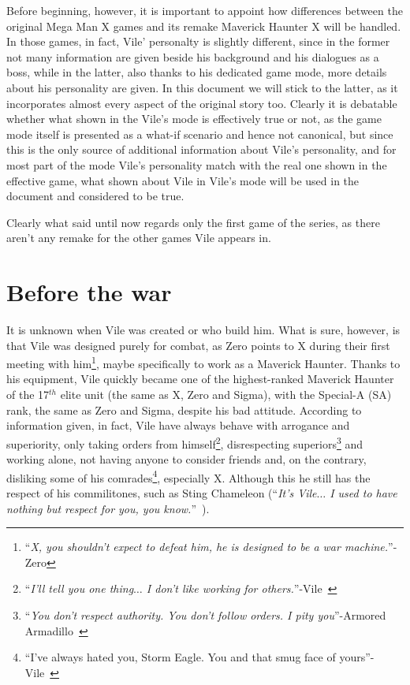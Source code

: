 Before beginning, however, it is important to appoint how differences between the original Mega Man X games and its remake Maverick Haunter X will be handled. In those games, in fact, Vile' personalty is slightly different, since in the former not many information are given beside his background and his dialogues as a boss, while in the latter, also thanks to his dedicated game mode, more details about his personality are given. In this document we will stick to the latter, as it incorporates almost every aspect of the original story too. Clearly it is debatable whether what shown in the Vile's mode is effectively true or not, as the game mode itself is presented as a what-if scenario and hence not canonical, but since this is the only source of additional information about Vile's personality, and for most part of the mode Vile's personality match with the real one shown in the effective game, what shown about Vile in Vile's mode will be used in the document and considered to be true.

Clearly what said until now regards only the first game of the series, as there aren't any remake for the other games Vile appears in.

\section{Before the war}
It is unknown when Vile was created or who build him. What is sure, however, is that Vile was designed purely for combat, as Zero points to X during their first meeting with him\footnote{``\textit{X, you shouldn't expect to defeat him, he is designed to be a war machine.}''- Zero}, maybe specifically to work as a Maverick Haunter. Thanks to his equipment, Vile quickly became one of the highest-ranked Maverick Haunter of the 17$^{th}$ elite unit (the same as X, Zero and Sigma), with the Special-A (SA) rank, the same as Zero and Sigma, despite his bad attitude. According to information given, in fact, Vile have always behave with arrogance and superiority, only taking orders from himself\footnote{``\textit{I'll tell you one thing$\dots$ I don't like working for others.}''-Vile~\cite{MHX:Vile_script}}, disrespecting superiors\footnote{``\textit{You don't respect authority. You don't follow orders. I pity you}''-Armored Armadillo~\cite{MHX:Vile_script}} and working alone, not having anyone to consider friends and, on the contrary, disliking some of his comrades\footnote{``I've always hated you, Storm Eagle. You and that smug face of yours''-Vile~\cite{MHX:Vile_script}}, especially X. Although this he still has the respect of his commilitones, such as Sting Chameleon (``\textit{It's Vile$\dots$ I used to have nothing but respect for you, you know.}''~\cite{MHX:Vile_script}).

